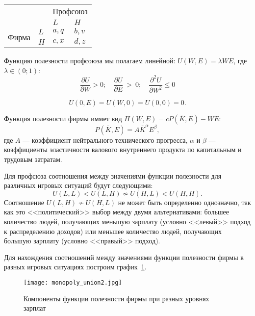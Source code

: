 \begin{table}[h]
	\centering
	\begin{tabular}{|l|l|l|l|}
		\hline
		\multicolumn{2}{|l|}{\multirow{2}{*}{}} & \multicolumn{2}{l|}{Профсоюз} \\ \cline{3-4} 
		\multicolumn{2}{|l|}{}                  & $L$            & $H$            \\ \hline
		\multirow{2}{*}{Фирма}     & $L$     & $a,q$          & $b,v$          \\ \cline{2-4} 
		& $H$     & $c,x$          & $d,z$          \\ \hline
	\end{tabular}
\end{table}
Функцию полезности профсоюза мы полагаем линейной: $U(W,E)=\lambda WE$, где $\lambda \in(0;1)$:
$$
	\frac{\partial U}{\partial W} > 0; 
	\quad 
	\frac{\partial U}{\partial E}~>~0 ; 
	\quad
	\frac{\partial^2 U}{\partial W^2} \leqslant 0
$$

$$
	U(0,E) = U(W,0) = U(0,0) = 0.
$$

Функция полезности фирмы иммет вид $\Pi(W,E)=cP(\bar{K},E)-WE$:
$$P(\bar{K}, E)=A\bar{K}^\alpha E^\beta,$$ 
где $A$ --- коэффициент нейтрального технического прогресса, $\alpha$ и $\beta$
--- коэффициенты эластичности валового внутреннего продукта по капитальным и
трудовым затратам.

Для профсюза соотношения между значениями функции полезности для различных игровых ситуаций
будут следующими:
\begin{equation}
U(L,L) < U(L,H) \nsim U(H, L) < U(H,H).
\end{equation}
Соотношение $U(L,H) \nsim U(H, L)$ не может быть определенно однозначно, так
как это <<политический>> выбор между двумя альтернативами: большее количество
людей, получающих меньшую зарплату (условно <<левый>> подход к распределению
доходов) или меньшее количество людей, получающих большую зарплату (условно
<<правый>> подход). 

Для нахождения соотношений между значениями функции полезности фирмы в разных игровых ситуациях
построим график~\ref{fig:monopoly_union1}.

\begin{figure}[h]
	\texttt{[image: monopoly\_union2.jpg]}
	\caption{Компоненты функции полезности фирмы при разных уровнях зарплат}
	\label{fig:monopoly_union1}
\end{figure}

